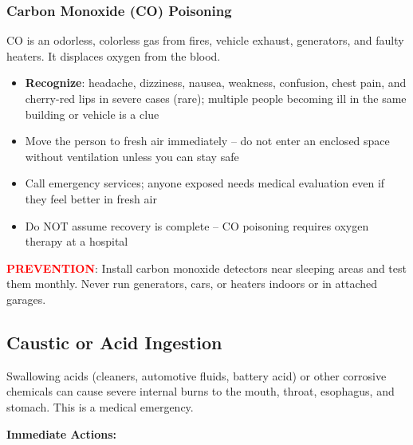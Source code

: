 \subsubsection{Carbon Monoxide (CO) Poisoning}

CO is an odorless, colorless gas from fires, vehicle exhaust, generators, and faulty heaters. It displaces oxygen from the blood.

\begin{itemize}[leftmargin=*]
  \item \textbf{Recognize}: headache, dizziness, nausea, weakness, confusion, chest pain, and cherry-red lips in severe cases (rare); multiple people becoming ill in the same building or vehicle is a clue
  \item Move the person to fresh air immediately -- do not enter an enclosed space without ventilation unless you can stay safe
  \item Call emergency services; anyone exposed needs medical evaluation even if they feel better in fresh air
  \item Do NOT assume recovery is complete -- CO poisoning requires oxygen therapy at a hospital
\end{itemize}

\noindent\textbf{\textcolor{red}{PREVENTION}}: Install carbon monoxide detectors near sleeping areas and test them monthly. Never run generators, cars, or heaters indoors or in attached garages.


\subsection{Caustic or Acid Ingestion}

Swallowing acids (cleaners, automotive fluids, battery acid) or other corrosive chemicals can cause severe internal burns to the mouth, throat, esophagus, and stomach. This is a medical emergency.

\textbf{Immediate Actions:}

